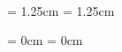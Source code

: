 %
%
%
\begin{titlepage}
  \begin{center}
    \vspace*{1cm}

    \Huge
    \textbf{\@title}\\
    \vspace{0.5cm}
    \Large
    \subtitle{}

    \large
    \vspace{1.5em}
    \@author\\
    \@date \\

    \leftskip  = 1.25cm
    \rightskip = 1.25cm

    \vspace{1.5em}
    \noindent
    
    \leftskip  = 0cm
    \rightskip = 0cm

    \vfill

  \end{center}
\end{titlepage}
